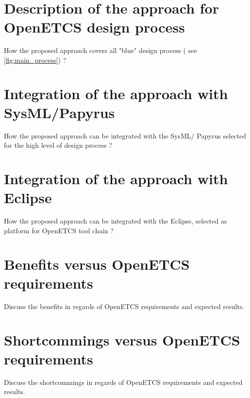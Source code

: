 \section{Description of the approach for OpenETCS design process}



\begin{todo_comment}
How the proposed approach covers all "blue" design process ( see \ref{fig:main_process}) ?
\end{todo_comment}

\section{Integration of the approach with SysML/Papyrus}

\begin{todo_comment}
How the proposed approach can be integrated with the SysML/ Papyrus selected for the high level of design process ?
\end{todo_comment}

\section{Integration of the approach with Eclipse}

\begin{todo_comment}
How the proposed approach can be integrated with the Eclipse, selected as platform for OpenETCS tool chain ?
\end{todo_comment}

\section{Benefits versus OpenETCS requirements}

\begin{todo_comment}
Discuss the benefits in regards of OpenETCS requirements and expected results.
\end{todo_comment}

\section{Shortcommings versus OpenETCS requirements}

\begin{todo_comment}
Discuss the shortcommings in regards of OpenETCS requirements and expected results.
\end{todo_comment}


